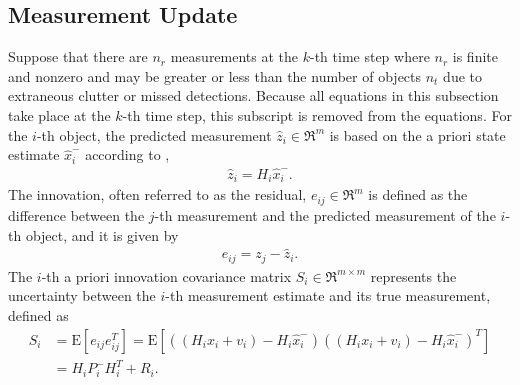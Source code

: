\subsection{Measurement Update}

Suppose that there are $n_r$ measurements at the $k$-th time step where $n_r$ is finite and nonzero and may be greater or less than the number of objects $n_t$ due to extraneous clutter or missed detections.
Because all equations in this subsection take place at the $k$-th time step, this subscript is removed from the equations.
For the $i$-th object, the predicted measurement $\hat z_i\in\Re^m$ is based on the a priori state estimate $\hat x_{i}^-$ according to ,
\begin{align}
\label{eqn:zlin}
\hat z_i = H_i\hat x_{i}^-.
\end{align}
The innovation, often referred to as the residual, $e_{ij}\in\Re^m$ is defined as the difference between the $j$-th measurement and the predicted measurement of the $i$-th object, and it is given by
\begin{align}
e_{ij} = z_j - \hat z_i.\label{eqn:eij}
\end{align}
The $i$-th a priori innovation covariance matrix $S_i\in\Re^{m\times m}$ represents the uncertainty between the $i$-th measurement estimate and its true measurement, defined as
\begin{align}
S_{i}&=\mathrm{E}[e_{ij} e_{ij}^T]=\mathrm{E}[\left((H_ix_i+v_i)-H_i\hat x_{i}^-\right)\left((H_ix_i+v_i)-H_i\hat x_{i}^-\right)^T]\nonumber\\
&=H_{i}P_{i}^{-}H_{i}^T+R_{i}.\label{eqn:S}
\end{align}

